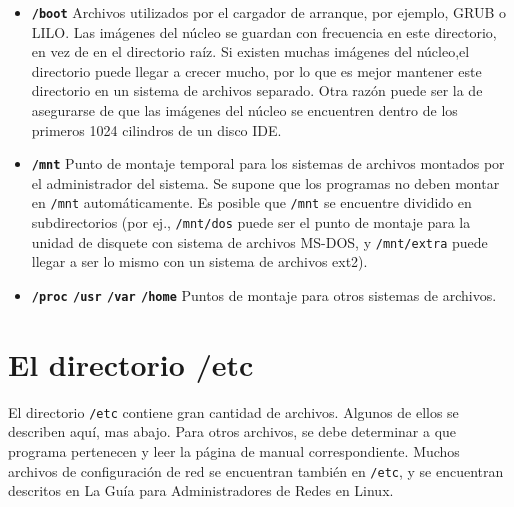 \begin{itemize}
	
	\item \textbf{\texttt{/boot}}
	 Archivos utilizados por el cargador de arranque, por
	ejemplo, GRUB o LILO. Las imágenes del núcleo se guardan con
	frecuencia en este directorio, en vez de en el directorio raíz. Si
	existen 		muchas imágenes del núcleo,el directorio puede
	llegar a crecer mucho, por 		lo que es mejor mantener este
	directorio en un sistema de archivos 			separado. Otra
	razón puede ser la de asegurarse de que las imágenes del núcleo se
	encuentren dentro de los primeros 1024 cilindros de un disco IDE.
	

	
	\item \textbf{\texttt{/mnt}}
	 Punto de montaje temporal para los sistemas de archivos
	montados por el administrador del sistema. Se supone que los programas
	no deben montar en \texttt{/mnt} automáticamente. Es posible
	que \texttt{/mnt} se encuentre dividido en subdirectorios
	(por ej., 			\texttt{/mnt/dos} puede ser
	el punto de montaje para la unidad de disquete con sistema de archivos
	MS-DOS, y \texttt{/mnt/extra} puede llegar a ser lo mismo
	con un sistema de archivos ext2).  

	
	\item \textbf{\texttt{/proc}
	\texttt{/usr} \texttt{/var}
	\texttt{/home} }  Puntos de
	montaje para otros sistemas de archivos.
	

 \end{itemize}  




\section{ El directorio /etc}

 El directorio \texttt{/etc} contiene gran cantidad de
archivos. Algunos de ellos se describen aquí, mas abajo. Para otros archivos, se
debe determinar a que programa pertenecen y leer la página de manual
correspondiente.  Muchos archivos de configuración de red se encuentran también
en \texttt{/etc}, y se encuentran descritos en La Guía para
Administradores de Redes en Linux.  

